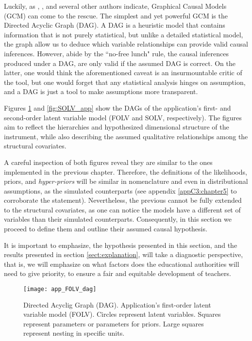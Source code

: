 Luckily, as \citet{McElreath_2020}, \citet{Hernan_et_al_2020}, and several other authors indicate, Graphical Causal Models (GCM) can come to the rescue. The simplest and yet powerful GCM is the Directed Acyclic Graph (DAG). A DAG is a heuristic model that contains information that is not purely statistical, but unlike a detailed statistical model, the graph allow us to deduce which variable relationships can provide valid causal inferences. However, abide by the ``no-free lunch" rule, the causal inferences produced under a DAG, are only valid if the assumed DAG is correct. On the latter, one would think the aforementioned caveat is an insurmountable critic of the tool, but one would forget that any statistical analysis hinges on assumption, and a DAG is just a tool to make assumptions more transparent.

Figures \ref{fig:FOLV_app} and \ref{fig:SOLV_app} show the DAGs of the application's first- and second-order latent variable model (FOLV and SOLV, respectively). The figures aim to reflect the hierarchies and hypothesized dimensional structure of the instrument, while also describing the assumed qualitative relationships among the structural covariates. 

A careful inspection of both figures reveal they are similar to the ones implemented in the previous chapter. Therefore, the definitions of the likelihoods, priors, and \textit{hyper-priors} will be similar in nomenclature and even in distributional assumptions, as the simulated counterparts (see appendix \ref{appC3:chapter5} to corroborate the statement). Nevertheless, the previous cannot be fully extended to the structural covariates, as one can notice the models have a different set of variables than their simulated counterparts. Consequently, in this section we proceed to define them and outline their assumed causal hypothesis.

It is important to emphasize, the hypothesis presented in this section, and the results presented in section \ref{sect:explanation}, will take a diagnostic perspective, that is, we will emphasize on what factors does the educational authorities will need to give priority, to ensure a fair and equitable development of teachers.
%
\begin{figure}[H]
	\centering
	\texttt{[image: app\_FOLV\_dag]}
	\caption[Directed Acyclic Graph (DAG). Application's first-order latent variable model (FOLV).]%
	{Directed Acyclig Graph (DAG). Application's first-order latent variable model (FOLV). Circles represent latent variables. Squares represent parameters or parameters for priors. Large squares represent nesting in specific units.}
	\label{fig:FOLV_app}
\end{figure}

